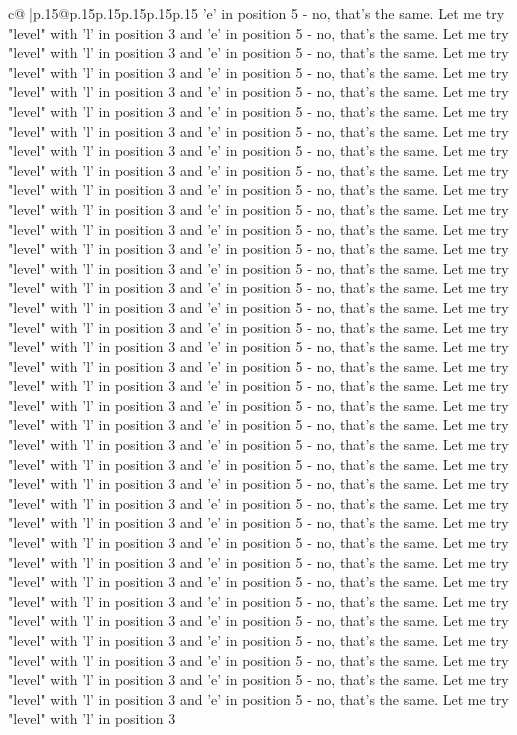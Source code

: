 \documentclass{article}
\begin{document}
{\begin{supertabular}{c@{$\;$}|p{.15\linewidth}@{}p{.15\linewidth}p{.15\linewidth}p{.15\linewidth}p{.15\linewidth}p{.15\linewidth}}
{{{'e' in position 5 {-} no, that's the same. Let me try "level" with 'l' in position 3 and 'e' in position 5 {-} no, that's the same. Let me try "level" with 'l' in position 3 and 'e' in position 5 {-} no, that's the same. Let me try "level" with 'l' in position 3 and 'e' in position 5 {-} no, that's the same. Let me try "level" with 'l' in position 3 and 'e' in position 5 {-} no, that's the same. Let me try "level" with 'l' in position 3 and 'e' in position 5 {-} no, that's the same. Let me try "level" with 'l' in position 3 and 'e' in position 5 {-} no, that's the same. Let me try "level" with 'l' in position 3 and 'e' in position 5 {-} no, that's the same. Let me try "level" with 'l' in position 3 and 'e' in position 5 {-} no, that's the same. Let me try "level" with 'l' in position 3 and 'e' in position 5 {-} no, that's the same. Let me try "level" with 'l' in position 3 and 'e' in position 5 {-} no, that's the same. Let me try "level" with 'l' in position 3 and 'e' in position 5 {-} no, that's the same. Let me try "level" with 'l' in position 3 and 'e' in position 5 {-} no, that's the same. Let me try "level" with 'l' in position 3 and 'e' in position 5 {-} no, that's the same. Let me try "level" with 'l' in position 3 and 'e' in position 5 {-} no, that's the same. Let me try "level" with 'l' in position 3 and 'e' in position 5 {-} no, that's the same. Let me try "level" with 'l' in position 3 and 'e' in position 5 {-} no, that's the same. Let me try "level" with 'l' in position 3 and 'e' in position 5 {-} no, that's the same. Let me try "level" with 'l' in position 3 and 'e' in position 5 {-} no, that's the same. Let me try "level" with 'l' in position 3 and 'e' in position 5 {-} no, that's the same. Let me try "level" with 'l' in position 3 and 'e' in position 5 {-} no, that's the same. Let me try "level" with 'l' in position 3 and 'e' in position 5 {-} no, that's the same. Let me try "level" with 'l' in position 3 and 'e' in position 5 {-} no, that's the same. Let me try "level" with 'l' in position 3 and 'e' in position 5 {-} no, that's the same. Let me try "level" with 'l' in position 3 and 'e' in position 5 {-} no, that's the same. Let me try "level" with 'l' in position 3 and 'e' in position 5 {-} no, that's the same. Let me try "level" with 'l' in position 3 and 'e' in position 5 {-} no, that's the same. Let me try "level" with 'l' in position 3 and 'e' in position 5 {-} no, that's the same. Let me try "level" with 'l' in position 3 and 'e' in position 5 {-} no, that's the same. Let me try "level" with 'l' in position 3 and 'e' in position 5 {-} no, that's the same. Let me try "level" with 'l' in position 3 and 'e' in position 5 {-} no, that's the same. Let me try "level" with 'l' in position 3 and 'e' in position 5 {-} no, that's the same. Let me try "level" with 'l' in position 3 and 'e' in position 5 {-} no, that's the same. Let me try "level" with 'l' in position 3 and 'e' in position 5 {-} no, that's the same. Let me try "level" with 'l' in position 3 and 'e' in position 5 {-} no, that's the same. Let me try "level" with 'l' in position 3 and 'e' in position 5 {-} no, that's the same. Let me try "level" with 'l' in position 3 }}}
\end{supertabular}}
\end{document}
